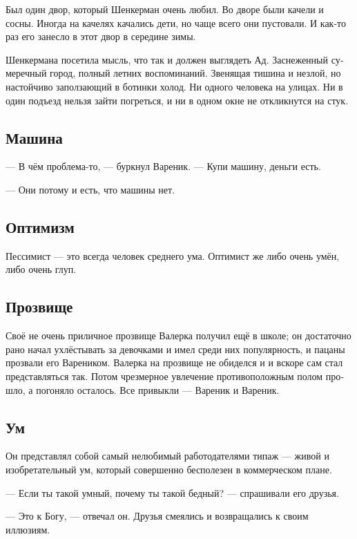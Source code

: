 \documentclass[a5paper,12pt,fleqn]{extbook}\usepackage{cooltooltips}\usepackage{polyglossia}\setdefaultlanguage[babelshorthands=true]{russian}\setotherlanguage{english}\defaultfontfeatures{Ligatures=TeX,Mapping=tex-text} \usepackage{xcolor}\definecolor{lightgray}{HTML}{bbbbbb}\color{lightgray}\newcommand{\ml}[3]{\textenglish{\textcolor{black}{#3}}}
\begin{document}
Был один двор, который Шенкерман очень любил.
Во дворе были качели и сосны.
Иногда на качелях качались дети, но чаще всего они пустовали.
И как-то раз его занесло в этот двор в середине зимы.

Шенкермана посетила мысль, что так и должен выглядеть Ад. 
Заснеженный сумеречный город, полный летних воспоминаний.
Звенящая тишина и незлой, но настойчиво заползающий в ботинки холод.
Ни одного человека на улицах.
Ни в один подъезд нельзя зайти погреться, и ни в одном окне не откликнутся на стук.

\subsection{Машина}

--- В чём проблема-то, --- буркнул Вареник.
--- Купи машину, деньги есть.

--- Они потому и есть, что машины нет.

\subsection{Оптимизм}

Пессимист --- это всегда человек среднего ума.
Оптимист же либо очень умён, либо очень глуп.

\subsection{Прозвище}

Своё не очень приличное прозвище Валерка получил ещё в школе;
он достаточно рано начал ухлёстывать за девочками и имел среди них популярность, и пацаны прозвали его Вареником.
Валерка на прозвище не обиделся и и вскоре сам стал представляться так.
Потом чрезмерное увлечение противоположным полом прошло, а погоняло осталось.
Все привыкли --- Вареник и Вареник.

\subsection{Ум}

Он представлял собой самый нелюбимый работодателями типаж --- живой и изобретательный ум, который совершенно бесполезен в коммерческом плане.

--- Если ты такой умный, почему ты такой бедный? --- спрашивали его друзья.

--- Это к Богу, --- отвечал он.
Друзья смеялись и возвращались к своим иллюзиям.
\end{document}
